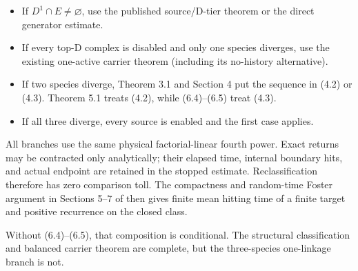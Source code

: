 \begin{itemize}
\tightlist
\item
  If \(D^1\cap E\ne\varnothing\), use the published source/D-tier
  theorem or the direct generator estimate.
\item
  If every top-D complex is disabled and only one species diverges, use
  the existing one-active carrier theorem (including its no-history
  alternative).
\item
  If two species diverge, Theorem 3.1 and Section 4 put the sequence in
  (4.2) or (4.3). Theorem 5.1 treats (4.2), while (6.4)--(6.5) treat
  (4.3).
\item
  If all three diverge, every source is enabled and the first case
  applies.
\end{itemize}

All branches use the same physical factorial-linear fourth power. Exact
returns may be contracted only analytically; their elapsed time,
internal boundary hits, and actual endpoint are retained in the stopped
estimate. Reclassification therefore has zero comparison toll. The
compactness and random-time Foster argument in Sections 5--7 of
\texttt{} then gives finite
mean hitting time of a finite target and positive recurrence on the
closed class.

Without (6.4)--(6.5), that composition is conditional. The structural
classification and balanced carrier theorem are complete, but the
three-species one-linkage branch is not.
